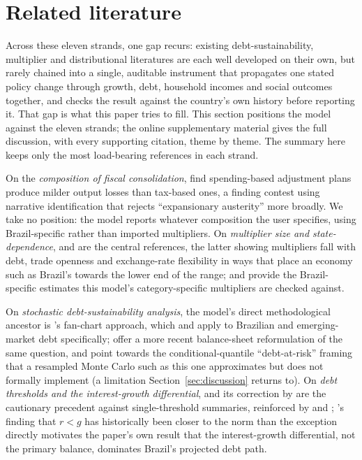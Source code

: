 \documentclass[11pt,a4paper]{article}
\begin{document}
\section{Related literature}
\label{sec:lit}

Across these eleven strands, one gap recurs: existing debt-sustainability, multiplier and distributional literatures are each well developed on their own, but rarely chained into a single, auditable instrument that propagates one stated policy change through growth, debt, household incomes and social outcomes together, and checks the result against the country's own history before reporting it. That gap is what this paper tries to fill. This section positions the model against the eleven strands; the online supplementary material gives the full discussion, with every supporting citation, theme by theme. The summary here keeps only the most load-bearing references in each strand.

On the \emph{composition of fiscal consolidation}, \citet{alesinaardagna2010,alesinafaverogiavazzi2015} find spending-based adjustment plans produce milder output losses than tax-based ones, a finding \citet{guajardoleighpescatori2014} contest using narrative identification that rejects ``expansionary austerity'' more broadly. We take no position: the model reports whatever composition the user specifies, using Brazil-specific rather than imported multipliers. On \emph{multiplier size and state-dependence}, \citet{auerbachgorodnichenko2012} and \citet{ilzetzkimendozavegh2013} are the central references, the latter showing multipliers fall with debt, trade openness and exchange-rate flexibility in ways that place an economy such as Brazil's towards the lower end of the range; \citet{pires2014} and \citet{resendepires2021} provide the Brazil-specific estimates this model's category-specific multipliers are checked against.

On \emph{stochastic debt-sustainability analysis}, the model's direct methodological ancestor is \citet{celasundebrunostry2007}'s fan-chart approach, which \citet{garciarigobon2004} and \citet{karamhostland2005,karamhostland2006} apply to Brazilian and emerging-market debt specifically; \citet{levyyeyatisturzenegger2023} offer a more recent balance-sheet reformulation of the same question, and \citet{prasadetal2019growthatrisk,lianpresbiterowiriadinata2020} point towards the conditional-quantile ``debt-at-risk'' framing that a resampled Monte Carlo such as this one approximates but does not formally implement (a limitation Section~\ref{sec:discussion} returns to). On \emph{debt thresholds and the interest-growth differential}, \citet{reinhartrogoff2010} and its correction by \citet{herndonashpollin2014} are the cautionary precedent against single-threshold summaries, reinforced by \citet{egert2015} and \citet{panizzapresbitero2014}; \citet{blanchard2019}'s finding that $r<g$ has historically been closer to the norm than the exception directly motivates the paper's own result that the interest-growth differential, not the primary balance, dominates Brazil's projected debt path.
\end{document}
